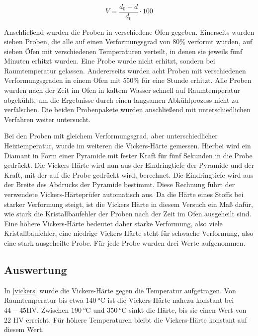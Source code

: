\documentclass[
	a4paper,
	12pt,
	pagesize,
	ngerman
]{scrartcl}
\begin{document}
\begin{equation}
V = \frac{d_0-d}{d_0} \cdot 100
\label{eq:ver}
\end{equation}

Anschließend wurden die Proben in verschiedene Öfen gegeben. Einerseits wurden sieben Proben, die alle auf einen Verformungsgrad von $80\%$ verformt wurden, auf sieben Öfen mit verschiedenen Temperaturen verteilt, in denen sie jeweils fünf Minuten erhitzt wurden. Eine Probe wurde nicht erhitzt, sondern bei Raumtemperatur gelassen. Andererseits wurden acht Proben mit verschiedenen Verformungsgraden in einem Ofen mit $550\%$ für eine Stunde erhitzt. Alle Proben wurden nach der Zeit im Ofen in kaltem Wasser schnell auf Raumtemperatur abgekühlt, um die Ergebnisse durch einen langsamen Abkühlprozess nicht zu verfälschen. Die beiden Probenpakete wurden anschließend mit unterschiedlichen Verfahren weiter untersucht.

Bei den Proben mit gleichem Verformungsgrad, aber unterschiedlicher Heiztemperatur, wurde im weiteren die Vickers-Härte gemessen. Hierbei wird ein Diamant in Form einer Pyramide mit fester Kraft für fünf Sekunden in die Probe gedrückt. Die Vickers-Härte wird nun aus der Eindringtiefe der Pyramide und der Kraft, mit der auf die Probe gedrückt wird, berechnet. Die Eindringtiefe wird aus der Breite des Abdrucks der Pyramide bestimmt. Diese Rechnung führt der verwendete Vickers-Härteprüfer automatisch aus. Da die Härte eines Stoffs bei starker Verformung steigt, ist die Vickers Härte in diesem Versuch ein Maß dafür, wie stark die Kristallbaufehler der Proben nach der Zeit im Ofen ausgeheilt sind. Eine höhere Vickers-Härte bedeutet daher starke Verformung, also viele Kristallbaufehler, eine niedrige Vickers-Härte steht für schwache Verformung, also eine stark ausgeheilte Probe. Für jede Probe wurden drei Werte aufgenommen.

\subsection{Auswertung}

In \cref{vickers} wurde die Vickers-Härte gegen die Temperatur aufgetragen. Von Raumtemperatur bis etwa $\SI{140}{\degreeCelsius}$ ist die Vickers-Härte nahezu konstant bei $44-45$HV. Zwischen $\SI{190}{\degreeCelsius}$ und $\SI{350}{\degreeCelsius}$ sinkt die Härte, bis sie einen Wert von $22$ HV erreicht. Für höhere Temperaturen bleibt die Vickers-Härte konstant auf diesem Wert.
\end{document}
